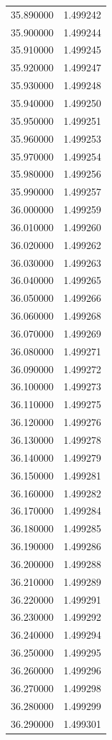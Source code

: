 \begin{tabular}{rr}
35.890000 & 1.499242 \\
35.900000 & 1.499244 \\
35.910000 & 1.499245 \\
35.920000 & 1.499247 \\
35.930000 & 1.499248 \\
35.940000 & 1.499250 \\
35.950000 & 1.499251 \\
35.960000 & 1.499253 \\
35.970000 & 1.499254 \\
35.980000 & 1.499256 \\
35.990000 & 1.499257 \\
36.000000 & 1.499259 \\
36.010000 & 1.499260 \\
36.020000 & 1.499262 \\
36.030000 & 1.499263 \\
36.040000 & 1.499265 \\
36.050000 & 1.499266 \\
36.060000 & 1.499268 \\
36.070000 & 1.499269 \\
36.080000 & 1.499271 \\
36.090000 & 1.499272 \\
36.100000 & 1.499273 \\
36.110000 & 1.499275 \\
36.120000 & 1.499276 \\
36.130000 & 1.499278 \\
36.140000 & 1.499279 \\
36.150000 & 1.499281 \\
36.160000 & 1.499282 \\
36.170000 & 1.499284 \\
36.180000 & 1.499285 \\
36.190000 & 1.499286 \\
36.200000 & 1.499288 \\
36.210000 & 1.499289 \\
36.220000 & 1.499291 \\
36.230000 & 1.499292 \\
36.240000 & 1.499294 \\
36.250000 & 1.499295 \\
36.260000 & 1.499296 \\
36.270000 & 1.499298 \\
36.280000 & 1.499299 \\
36.290000 & 1.499301 \\

\end{tabular}
